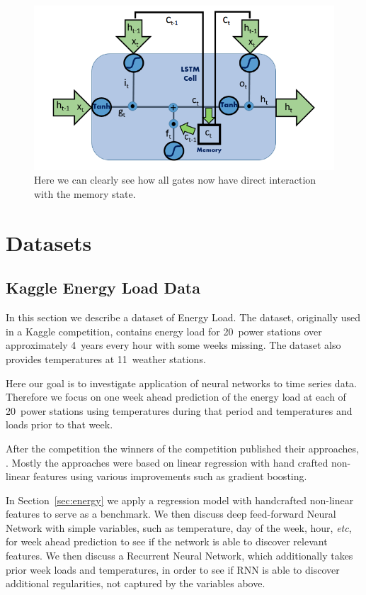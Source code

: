 \documentclass{article} %
\begin{document}
\begin{figure}[H]
\begin{center}
\includegraphics[width=0.8 \linewidth]{LSTM_Peepholes.png} 
\end{center}
\caption{Here we can clearly see how all gates now have direct interaction with the memory state.}
\end{figure}



\section{Datasets}
\label{sec:data}


\subsection{Kaggle Energy Load Data}
\label{sec:data/energy}

In this section we describe a dataset of Energy Load.
The dataset, originally used in a Kaggle competition, contains energy load for 20~power stations over approximately 4~years every hour with some weeks missing. The dataset also provides temperatures at 11~weather stations. 

Here our goal is to investigate application of neural networks to time series data. Therefore we focus on one week ahead prediction of the energy load at each of 20~power stations using temperatures during that period and temperatures and loads prior to that week.

After the competition the winners of the competition published their approaches, \cite{energy_kaggle}. Mostly the approaches were based on linear regression with hand crafted non-linear features using various improvements such as gradient boosting. 

In Section~\ref{sec:energy} we apply a regression model with handcrafted non-linear features to serve as a benchmark. We then discuss deep feed-forward Neural Network with simple variables, such as temperature, day of the week, hour, {\it etc},
for week ahead prediction to see if the network is able to discover relevant features. We then discuss a Recurrent Neural Network, which additionally takes prior week loads and temperatures, in order to see if RNN is able to discover additional regularities, not captured by the variables above.
\end{document}
